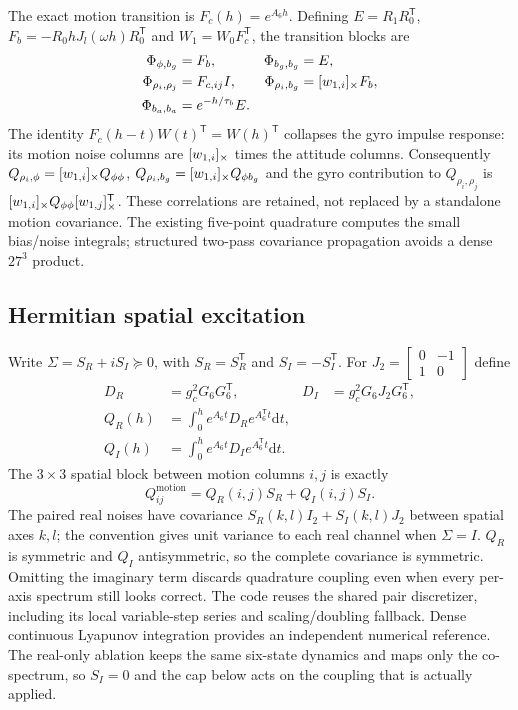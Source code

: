 \documentclass[conference]{IEEEtran}
\newcommand{\T}{^{\mathsf T}}\newcommand{\Hh}{^{\mathsf H}}
\newcommand{\dd}{\mathrm d}\newcommand{\R}{\mathbb R}
\begin{document}
The exact motion transition is $F_c(h)=e^{A_6h}$. Defining
$E=R_1R_0\T$, $F_b=-R_0hJ_l(\omega h)R_0\T$ and
$W_1=W_0F_c\T$, the transition blocks are
\begin{align}
 \Phi_{\phi,b_g}&=F_b,&\Phi_{b_g,b_g}&=E,\\
 \Phi_{\rho_i,\rho_j}&=F_{c,ij}I,&
 \Phi_{\rho_i,b_g}&=[w_{1,i}]_\times F_b,\\
 \Phi_{b_a,b_a}&=e^{-h/\tau_b}E .
\end{align}
The identity $F_c(h-t)W(t)\T=W(h)\T$ collapses the gyro impulse response:
its motion noise columns are $[w_{1,i}]_\times$ times the attitude columns.
Consequently $Q_{\rho_i,\phi}=[w_{1,i}]_\times Q_{\phi\phi}$,
$Q_{\rho_i,b_g}=[w_{1,i}]_\times Q_{\phi b_g}$ and the gyro contribution to
$Q_{\rho_i,\rho_j}$ is
$\sk{w_{1,i}}Q_{\phi\phi}\sk{w_{1,j}}\T$.
These correlations are retained, not replaced by a standalone motion covariance.
The existing five-point quadrature computes the small bias/noise integrals;
structured two-pass covariance propagation avoids a dense $27^3$ product.

\subsection{Hermitian spatial excitation}
Write $\Sigma=S_R+iS_I\succeq0$, with $S_R=S_R\T$ and
$S_I=-S_I\T$. For
$J_2=\left[\begin{smallmatrix}0&-1\\1&0\end{smallmatrix}\right]$ define
\begin{align}
 D_R&=g_c^2G_6G_6\T,&D_I&=g_c^2G_6J_2G_6\T,\\
 Q_R(h)&=\int_0^h e^{A_6t}D_Re^{A_6\T t}\dd t,\\
 Q_I(h)&=\int_0^h e^{A_6t}D_Ie^{A_6\T t}\dd t .
\end{align}
The $3\times3$ spatial block between motion columns $i,j$ is exactly
\begin{equation}
 Q^{\mathrm{motion}}_{ij}=Q_R(i,j)S_R+Q_I(i,j)S_I.
 \label{eq:hermitian}
\end{equation}
The paired real noises have covariance
$S_R(k,l)I_2+S_I(k,l)J_2$ between spatial axes $k,l$; the convention gives
unit variance to each real channel when $\Sigma=I$.
$Q_R$ is symmetric and $Q_I$ antisymmetric, so the complete covariance is
symmetric. Omitting the imaginary term discards quadrature coupling even
when every per-axis spectrum still looks correct. The code reuses the shared
pair discretizer, including its local variable-step series and scaling/doubling
fallback. Dense continuous Lyapunov integration provides an independent
numerical reference. The real-only ablation keeps the same six-state dynamics
and maps only the co-spectrum, so $S_I=0$ and the cap below acts on the
coupling that is actually applied.
\end{document}
